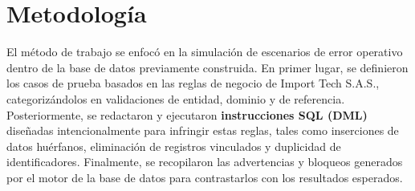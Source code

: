 \chapter{Metodología}
El método de trabajo se enfocó en la simulación de escenarios de error operativo dentro de la base de datos previamente construida. En primer lugar, se definieron los casos de prueba basados en las reglas de negocio de Import Tech S.A.S., categorizándolos en validaciones de entidad, dominio y de referencia. Posteriormente, se redactaron y ejecutaron \textbf{instrucciones SQL (DML)} diseñadas intencionalmente para infringir estas reglas, tales como inserciones de datos huérfanos, eliminación de registros vinculados y duplicidad de identificadores. Finalmente, se recopilaron las advertencias y bloqueos generados por el motor de la base de datos para contrastarlos con los resultados esperados.